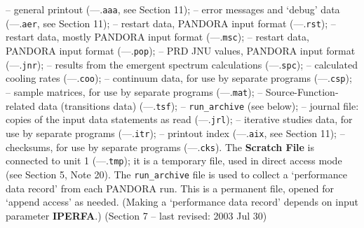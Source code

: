 \spice
{} -- general printout (---.{\tt aaa}, see Section 11);
 -- error messages and `debug' data (---.{\tt aer}, see Section 11);
 -- restart data, PANDORA input format (---.{\tt rst});
 -- restart data, mostly PANDORA input format (---.{\tt msc});
 -- restart data, PANDORA input format (---.{\tt pop});
 -- PRD JNU values, PANDORA input format (---.{\tt jnr});
 -- results from the emergent spectrum calculations (---.{\tt spc});
 -- calculated cooling rates (---.{\tt coo});
 -- continuum data, for use by separate programs (---.{\tt csp});
 -- sample matrices, for use by separate programs (---.{\tt mat});
 -- Source-Function-related data (transitions data) (---.{\tt tsf});
 -- {\tt run\_archive} (see below);
 -- journal file: copies of the input data statements as read (---.{\tt jrl});
 -- iterative studies data, for use by separate programs (---.{\tt itr});
 -- printout index (---.{\tt aix}, see Section 11);
 -- checksums, for use by separate programs (---.{\tt cks}).
\blankline
The {\bf Scratch File} is connected to unit 1 (---.{\tt tmp}); it is a temporary file,
used in direct access mode (see Section 5, Note 20).
\blankline
The {\tt run\_archive} file is used to collect a `performance data record' from each
PANDORA run. This is a permanent file, opened for `append access' as needed. (Making
a `performance data record' depends on input parameter {\bf IPERFA}.)
\vfill
\noindent (Section 7 -- last revised: 2003 Jul 30) \par
{}
\ej
